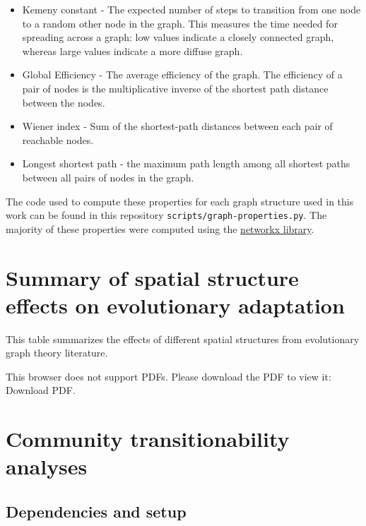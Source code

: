\documentclass[
]{book}
\begin{document}
\begin{itemize}
\item
  Kemeny constant - The expected number of steps to transition from one node to a random other node in the graph. This measures the time needed for spreading across a graph: low values indicate a closely connected graph, whereas large values indicate a more diffuse graph.
\item
  Global Efficiency - The average efficiency of the graph. The efficiency of a pair of nodes is the multiplicative inverse of the shortest path distance between the nodes.
\item
  Wiener index - Sum of the shortest-path distances between each pair of reachable nodes.
\item
  Longest shortest path - the maximum path length among all shortest paths between all pairs of nodes in the graph.
\end{itemize}

The code used to compute these properties for each graph structure used in this work can be found in this repository \texttt{scripts/graph-properties.py}.
The majority of these properties were computed using the \href{https://networkx.org/documentation/stable/index.html}{networkx library}.

\hypertarget{summary-of-spatial-structure-effects-on-evolutionary-adaptation}{%
\chapter{Summary of spatial structure effects on evolutionary adaptation}\label{summary-of-spatial-structure-effects-on-evolutionary-adaptation}}

This table summarizes the effects of different spatial structures from evolutionary graph theory literature.

This browser does not support PDFs. Please download the PDF to view it: Download PDF.

\hypertarget{community-transitionability-analyses}{%
\chapter{Community transitionability analyses}\label{community-transitionability-analyses}}

\hypertarget{dependencies-and-setup}{%
\section{Dependencies and setup}\label{dependencies-and-setup}}
\end{document}
